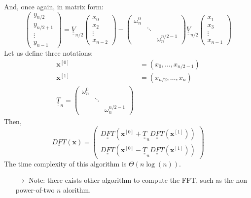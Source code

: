 \documentclass[12pt, openany]{report}
\theoremstyle{definition}
\def\mat#1{\underline{\underline{#1}}}
\begin{document}
And, once again, in matrix form:
\begin{equation}
	\begin{pmatrix}
		y_{n/2} \\ y_{n/2+1} \\ \vdots \\ y_{n-1}
		\end{pmatrix} = \mat{V}_{n/2} \begin{pmatrix}
			x_0\\x_2 \\ \vdots \\ x_{n-2}
		\end{pmatrix} - \begin{pmatrix}
			\omega_n^0 && \\ & \ddots & \\ & & \omega_n^{n/2-1}
	\end{pmatrix} \mat{V}_{n/2} \begin{pmatrix}
		x_1\\x_3\\\vdots \\x_{n-1}
	\end{pmatrix}
\end{equation}
Let us define three notations: 
\begin{equation}
	\begin{aligned}
		\textbf{x}^{[0]} &= (x_0,\dots, x_{n/2-1})\\
		\textbf{x}^{[1]} &= (x_{n/2},\dots, x_{n})\\
		\mat{T}_n = \begin{pmatrix}
			\omega_n^0 & & \\ & \ddots & \\ & & \omega_n^{n/2-1}
		\end{pmatrix}
	\end{aligned}
\end{equation}
Then,
\begin{equation}
	\mat{DFT}(\textbf{x}) = \begin{pmatrix}
		\mat{DFT}(\textbf{x}^{[0]} + \mat{T}_n \mat{DFT}(\textbf{x}^{[1]}))\\
		\mat{DFT}(\textbf{x}^{[0]} - \mat{T}_n \mat{DFT}(\textbf{x}^{[1]}))
	\end{pmatrix}
\end{equation}
The time complexity of this algorithm is $\Theta(n\log(n))$. 
\begin{itemize}
	\item [$\rightarrow$] Note: there exists other algorithm to compute the FFT, such as the non power-of-two $n$ alorithm.
\end{itemize}
\end{document}
